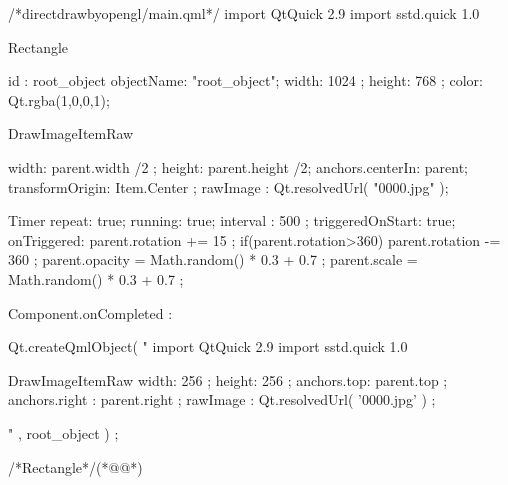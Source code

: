\label{f000042}    %
\FloatBarrier                                  %
\begin{thebookfilesourceone}[escapeinside={(*@}{@*)},
caption=GoodLuck,
title=\filesourcenumbernameone \thefilesourcenumber
]
/*directdrawbyopengl/main.qml*/
import QtQuick 2.9
import sstd.quick 1.0

Rectangle{
    id : root_object
    objectName: "root_object";
    width: 1024 ;
    height: 768 ;
    color: Qt.rgba(1,0,0,1);

    DrawImageItemRaw {

        width: parent.width /2  ;
        height: parent.height /2;
        anchors.centerIn: parent;
        transformOrigin: Item.Center ;
        rawImage : Qt.resolvedUrl( "0000.jpg" );

        Timer{
            repeat: true;
            running: true;
            interval : 500 ;
            triggeredOnStart: true;
            onTriggered: {
                parent.rotation += 15 ;
                if(parent.rotation>360){
                    parent.rotation -= 360 ;
                }
                parent.opacity = Math.random() * 0.3 + 0.7 ;
                parent.scale = Math.random() * 0.3 + 0.7 ;
            }
        }

    }


    Component.onCompleted : {
        Qt.createQmlObject(
"
import QtQuick 2.9
import sstd.quick 1.0

DrawImageItemRaw {
    width: 256   ;
    height: 256  ;
    anchors.top: parent.top          ;
    anchors.right : parent.right           ;
    rawImage : Qt.resolvedUrl( '0000.jpg' ) ;
}

" , root_object  ) ;
    }

}/*Rectangle*/(*@\marginpar[\hfill\setlength\fboxsep{2pt}\fbox{\footnotesize{\kaishu\parbox{1em}{\setlength{\baselineskip}{2pt}\filesourcenumbernameone}}\footnotesize{\thefilesourcenumber}}]{\setlength\fboxsep{2pt}\fbox{\footnotesize{\kaishu\parbox{1em}{\setlength{\baselineskip}{2pt}\filesourcenumbernameone}}\footnotesize{\thefilesourcenumber}}}@*)\end{thebookfilesourceone}          %
\addtocounter{lstlisting}{-1}   %


